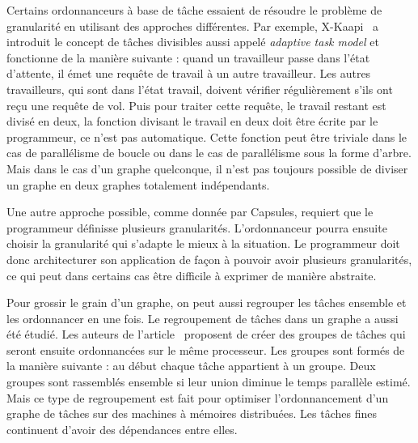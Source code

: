 Certains ordonnanceurs à base de tâche essaient de résoudre le problème de granularité en utilisant des approches différentes.
%
Par exemple, X-Kaapi~\cite{xkaapi} a introduit le concept de tâches divisibles aussi appelé {\em adaptive task model} et fonctionne de la manière suivante :
%
quand un travailleur passe dans l'état d'attente, il émet une requête de travail à un autre travailleur.
%
Les autres travailleurs, qui sont dans l'état travail, doivent vérifier régulièrement s'ils ont reçu une requête de vol.
%
Puis pour traiter cette requête, le travail restant est divisé en deux, la fonction divisant le travail en deux doit être écrite par le programmeur, ce n'est pas automatique.
%
Cette fonction peut être triviale dans le cas de parallélisme de boucle ou dans le cas de parallélisme sous la forme d'arbre.
%
Mais dans le cas d'un graphe quelconque, il n'est pas toujours possible de diviser un graphe en deux graphes totalement indépendants.

Une autre approche possible, comme donnée par Capsules\cite{capsules}, requiert que le programmeur définisse plusieurs granularités.
%
L'ordonnanceur pourra ensuite choisir la granularité qui s'adapte le mieux à la situation.
%
Le programmeur doit donc architecturer son application de façon à pouvoir avoir plusieurs granularités, ce qui peut dans certains cas être difficile à exprimer de manière abstraite.

Pour grossir le grain d'un graphe, on peut aussi regrouper les tâches ensemble et les ordonnancer en une fois.
%
Le regroupement de tâches dans un graphe a aussi été étudié.
%
Les auteurs de l'article~\cite{clustering_task} proposent de créer des groupes de tâches qui seront ensuite ordonnancées sur le même processeur.
%
Les groupes sont formés de la manière suivante : au début chaque tâche appartient à un groupe.
%
Deux groupes sont rassemblés ensemble si leur union diminue le temps parallèle estimé.
%
Mais ce type de regroupement est fait pour optimiser l'ordonnancement d'un graphe de tâches sur des machines à mémoires distribuées.
%
Les tâches fines continuent d'avoir des dépendances entre elles.

